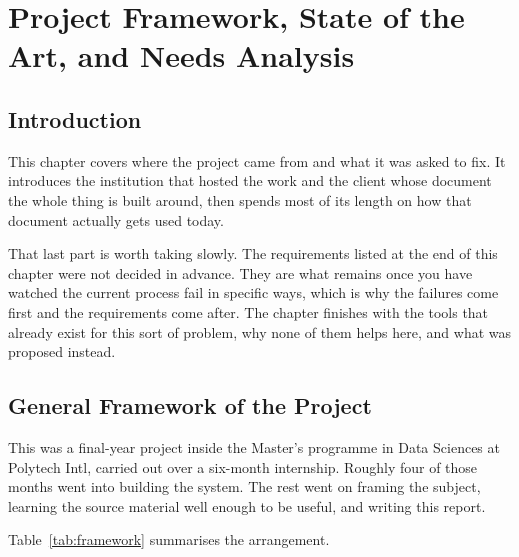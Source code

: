 \chapter{Project Framework, State of the Art, and Needs Analysis}
\minitoc

\section*{Introduction}

This chapter covers where the project came from and what it was asked to fix. It
introduces the institution that hosted the work and the client whose document
the whole thing is built around, then spends most of its length on how that
document actually gets used today.

That last part is worth taking slowly. The requirements listed at the end of
this chapter were not decided in advance. They are what remains once you have
watched the current process fail in specific ways, which is why the failures
come first and the requirements come after. The chapter finishes with the tools
that already exist for this sort of problem, why none of them helps here, and
what was proposed instead.

\section{General Framework of the Project}

This was a final-year project inside the Master's programme in Data Sciences at
Polytech Intl, carried out over a six-month internship. Roughly four of those
months went into building the system. The rest went on framing the subject,
learning the source material well enough to be useful, and writing this report.

Table~\ref{tab:framework} summarises the arrangement.

